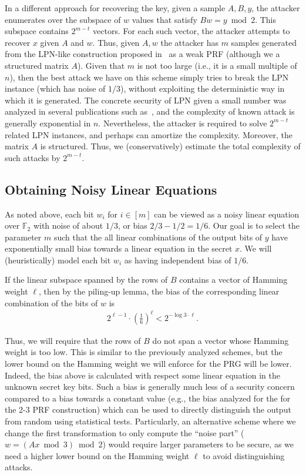 \documentclass[orivec,envcountsect]{llncs}
\begin{document}
In a different approach for recovering the key, given a sample $A,B,y$,
the attacker enumerates over the subspace of $w$ values that satisfy $B w = y \bmod 2$.
This subspace contains $2^{m - t}$ vectors. For each such vector, the attacker attempts to recover $x$
given $A$ and $w$. Thus, given $A,w$ the attacker has $m$ samples
generated from the LPN-like construction proposed in~\cite{BonehIPSW18} as a weak PRF
(although we a structured matrix $A$).
Given that $m$ is not too large (i.e., it is a small multiple of $n$),
then the best attack we have on this scheme simply tries to break the LPN instance (which has noise of $1/3$),
without exploiting the deterministic way in which it is generated.
The concrete security of LPN given a small number was analyzed in several publications such as~\cite{EsserKM17},
and the complexity of known attack is generally exponential in $n$.
Nevertheless, the attacker is required to solve $2^{m - t}$ related LPN instances,
and perhaps can amortize the complexity. Moreover, the matrix $A$ is structured.
Thus, we (conservatively) estimate the total complexity of such attacks by $2^{m - t}$.

\subsection{Obtaining Noisy Linear Equations}


As noted above, each bit $w_i$ for $i \in [m]$ can be viewed as a noisy linear equation over $\mathbb{F}_2$
with noise of about $1/3$, or bias $2/3 - 1/2 = 1/6$.
Our goal is to select the parameter $m$ such that
the all linear combinations of the output bits of $y$
have exponentially small bias towards a linear equation in the secret $x$.
We will (heuristically) model each bit $w_i$ as having independent bias of $1/6$.

If the linear subspace spanned by the rows of $B$ contains a vector of Hamming weight $\ell$,
then by the piling-up lemma, the bias of the corresponding linear combination of the bits of $w$ is
\begin{align}\label{eq:bias_linear}
2^{\ell - 1} \cdot (\tfrac{1}{6})^{\ell} < 2^{-\log 3 \cdot \ell}.
\end{align}

Thus, we will require
that the rows of $B$ do not span a vector whose Hamming weight is too low.
This is similar to the previously analyzed schemes,
but the lower bound on the Hamming weight we will enforce for the PRG will be lower.
Indeed, the bias above is calculated with respect some linear equation in the unknown secret key bits.
Such a bias is generally much less of a security concern compared to a bias towards a constant value
(e.g., the bias analyzed for the for the 2-3 PRF construction) which can be used
to directly distinguish the output from random using statistical tests.
Particularly, an alternative scheme where we change the first transformation
to only compute the ``noise part''
($w =(Ax \bmod 3) \bmod 2$) would require larger parameters to be secure,
as we need a higher lower bound on the Hamming weight $\ell$ to avoid distinguishing attacks.
\end{document}
